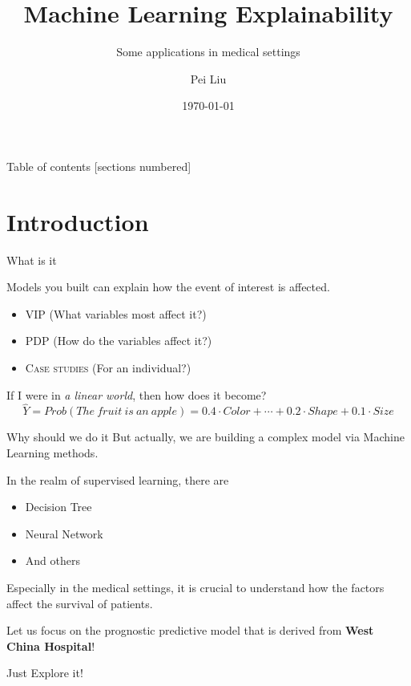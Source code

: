 \documentclass[10pt]{beamer}
\title{Machine Learning Explainability}
\subtitle{Some applications in medical settings}
\date{\today}
\author{Pei Liu}
\institute{Department of Computer Science @UESTC}
\begin{document}
\maketitle

\begin{frame}{Table of contents}
  [sections numbered]
  \tableofcontents[hideallsubsections]
\end{frame}

\section{Introduction}

\begin{frame}[fragile]{What is it}
  
  Models you built can explain how the event of interest is affected.
  \begin{itemize}
    \item \textsc{VIP} (What variables most affect it?)
    \item \textsc{PDP} (How do the variables affect it?)
    \item \textsc{Case studies} (For an individual?)
  \end{itemize}

  If I were in \emph{a linear world}, then how does it become?
  \begin{equation*}
    \hat Y = Prob(The\ fruit\ is\ an\ apple) = 0.4 \cdot Color + \cdots + 0.2 \cdot Shape + 0.1 \cdot Size
  \end{equation*}

\end{frame}
\begin{frame}[fragile]{Why should we do it}
  But actually, we are building a complex model via Machine Learning methods.

  In the realm of supervised learning, there are 
  \begin{itemize}
    \item Decision Tree
    \item Neural Network
    \item And others
  \end{itemize}

  Especially in the medical settings, it is crucial to understand how the factors affect the survival of patients.

  Let us focus on the prognostic predictive model that is derived from \textbf{West China Hospital}!

  \alert{Just Explore it!}
\end{frame}
\end{document}
